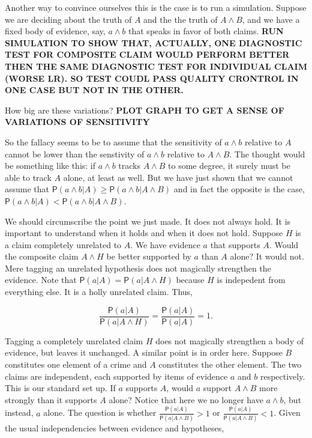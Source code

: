 \documentclass[10pt,dvipsnames,enabledeprecatedfontcommands]{scrartcl}
\newcommand{\pr}[1]{\mathsf{P}(#1)}
\begin{document}
Another way to convince ourselves this is the case is to run a
simulation. Suppose we are deciding about the truth of \(A\) and the the
truth of \(A\wedge B\), and we have a fixed body of evidence, say,
\(a\wedge b\) that speaks in favor of both claims.
\textbf{RUN SIMULATION TO SHOW THAT, ACTUALLY, ONE DIAGNOSTIC TEST FOR COMPOSITE CLAIM WOULD PERFORM BETTER 
THEN THE SAME DIAGNOSTIC TEST FOR INDIVIDUAL CLAIM (WORSE LR). SO TEST COUDL PASS QUALITY CRONTROL IN ONE CASE BUT NOT IN THE OTHER.}

How big are these variations?
\textbf{PLOT GRAPH TO GET A SENSE OF VARIATIONS OF SENSITIVITY}

So the fallacy seems to be to assume that the sensitivity of
\(a\wedge b\) relative to \(A\) cannot be lower than the senstivity of
\(a\wedge b\) relative to \(A\wedge B\). The thought would be something
like this: if \(a \wedge b\) tracks \(A\wedge B\) to some degree, it
surely must be able to track \(A\) alone, at least as well. But we have
just shown that we cannot assume that
\(\pr{a\wedge b \vert A} \geq \pr{a\wedge b \vert A\wedge B}\) and in
fact the opposite is the case,
\(\pr{a\wedge b \vert A} < \pr{a\wedge b \vert A\wedge B}\).

We should circumscribe the point we just made. It does not always hold.
It is important to understand when it holds and when it does not hold.
Suppose \(H\) is a claim completely unrelated to \(A\). We have evidence
\(a\) that supports \(A\). Would the composite claim \(A\wedge H\) be
better supported by \(a\) than \(A\) alone? It would not. Mere tagging
an unrelated hypothesis does not magically strengthen the evidence. Note
that \(\pr{a \vert A}=\pr{a \vert A \wedge H}\) because \(H\) is
indepedent from everything else. It is a holly unrelated claim. Thus,

\[\frac{\pr{a \vert A}}{\pr{a \vert A \wedge H}}=\frac{\pr{a \vert A}}{\pr{a \vert A}}=1.\]

\noindent Tagging a completely unrelated claim \(H\) does not magically
strengthen a body of evidence, but leaves it unchanged. A similar point
is in order here. Suppose \(B\) constitutes one element of a crime and
\(A\) constitutes the other element. The two claims are independent,
each supported by items of evidence \(a\) and \(b\) respectively. This
is our standard set up. If \(a\) supports \(A\), would \(a\) support
\(A\wedge B\) more strongly than it supports \(A\) alone? Notice that
here we no longer have \(a\wedge b\), but instead, \(a\) alone. The
question is whether \(\frac{\pr{a \vert A}}{\pr{a \vert A \wedge B}}>1\)
or \(\frac{\pr{a \vert A}}{\pr{a \vert A \wedge B}}<1\). Given the usual
independencies between evidence and hypotheses,
\end{document}
